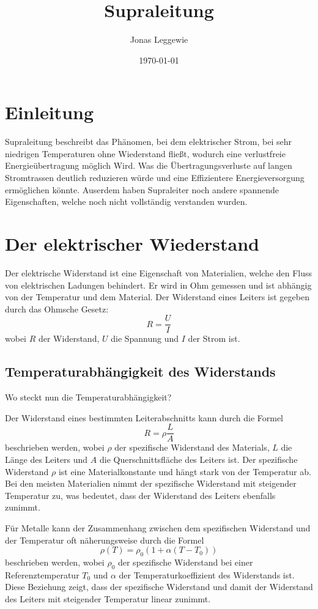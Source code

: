 \documentclass[a4paper]{scrartcl}
\title{Supraleitung}
\author{Jonas Leggewie}
\date{\today}
\begin{document}
\maketitle
\newpage
\tableofcontents
\newpage


\section{Einleitung}
Supraleitung beschreibt das Phänomen, bei dem elektrischer Strom, bei sehr niedrigen Temperaturen 
ohne Wiederstand fließt, wodurch eine verlustfreie Energieübertragung möglich Wird. Was die 
Übertragungsverluste auf langen Stromtrassen deutlich reduzieren würde und eine Effizientere 
Energieversorgung ermöglichen könnte. Auserdem haben Supraleiter noch andere spannende 
Eigenschaften, welche noch nicht vollständig verstanden wurden. 

\section{Der elektrischer Wiederstand}
Der elektrische Widerstand ist eine Eigenschaft von Materialien, welche den Fluss von elektrischen
Ladungen behindert. Er wird in Ohm gemessen und ist abhängig von der Temperatur und dem Material.
Der Widerstand eines Leiters ist gegeben durch das Ohmsche Gesetz:
\begin{equation}
    R = \frac{U}{I}
\end{equation}
wobei $R$ der Widerstand, $U$ die Spannung und $I$ der Strom ist.


\subsection{Temperaturabhängigkeit des Widerstands}
Wo steckt nun die Temperaturabhängigkeit?

Der Widerstand eines bestimmten Leiterabschnitts kann durch die Formel
\begin{equation}
    R = \rho \frac{L}{A}
\end{equation}
beschrieben werden, wobei $\rho$ der spezifische Widerstand des Materials, $L$ die Länge des Leiters und $A$ die Querschnittsfläche des Leiters ist. Der spezifische Widerstand $\rho$ ist eine Materialkonstante und hängt stark von der Temperatur ab. Bei den meisten Materialien nimmt der spezifische Widerstand mit steigender Temperatur zu, was bedeutet, dass der Widerstand des Leiters ebenfalls zunimmt.

Für Metalle kann der Zusammenhang zwischen dem spezifischen Widerstand und der Temperatur oft näherungsweise durch die Formel
\begin{equation}
    \rho(T) = \rho_0 (1 + \alpha (T - T_0))
\end{equation}
beschrieben werden, wobei $\rho_0$ der spezifische Widerstand bei einer Referenztemperatur $T_0$ und $\alpha$ der Temperaturkoeffizient des Widerstands ist. Diese Beziehung zeigt, dass der spezifische Widerstand und damit der Widerstand des Leiters mit steigender Temperatur linear zunimmt.
\end{document}
